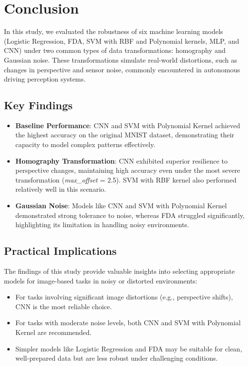 \documentclass{article}
\begin{document}
\section{Conclusion}

In this study, we evaluated the robustness of six machine learning models (Logistic Regression, FDA, SVM with RBF and Polynomial kernels, MLP, and CNN) under two common types of data transformations: homography and Gaussian noise. These transformations simulate real-world distortions, such as changes in perspective and sensor noise, commonly encountered in autonomous driving perception systems.

\subsection*{Key Findings}
\begin{itemize}
    \item \textbf{Baseline Performance}: CNN and SVM with Polynomial Kernel achieved the highest accuracy on the original MNIST dataset, demonstrating their capacity to model complex patterns effectively.
    \item \textbf{Homography Transformation}: CNN exhibited superior resilience to perspective changes, maintaining high accuracy even under the most severe transformation (\textit{max\_offset} = 2.5). SVM with RBF kernel also performed relatively well in this scenario.
    \item \textbf{Gaussian Noise}: Models like CNN and SVM with Polynomial Kernel demonstrated strong tolerance to noise, whereas FDA struggled significantly, highlighting its limitation in handling noisy environments.
\end{itemize}

\subsection*{Practical Implications}
The findings of this study provide valuable insights into selecting appropriate models for image-based tasks in noisy or distorted environments:
\begin{itemize}
    \item For tasks involving significant image distortions (e.g., perspective shifts), CNN is the most reliable choice.
    \item For tasks with moderate noise levels, both CNN and SVM with Polynomial Kernel are recommended.
    \item Simpler models like Logistic Regression and FDA may be suitable for clean, well-prepared data but are less robust under challenging conditions.
\end{itemize}
\end{document}
